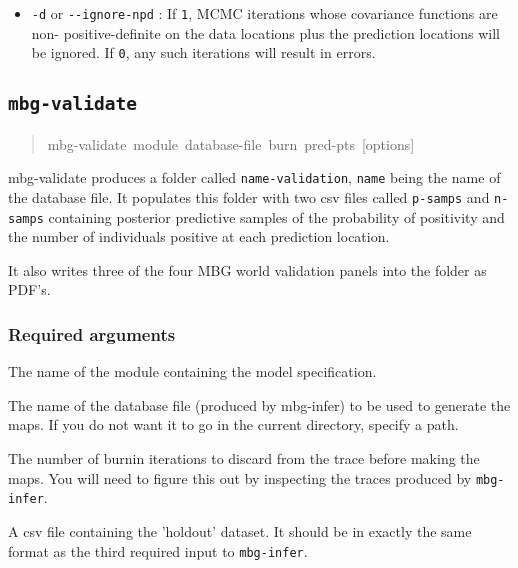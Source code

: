 
%
\begin{itemize}

\item \texttt{-d} or \texttt{-{}-ignore-npd} : If \texttt{1}, MCMC iterations whose covariance functions are non-
positive-definite on the data locations plus the prediction locations will be ignored. If
\texttt{0}, any such iterations will result in errors.

\end{itemize}




\subsection{\texttt{mbg-validate}%
}
%
\begin{quote}{\ttfamily \raggedright \noindent
mbg-validate~module~database-file~burn~pred-pts~{[}options{]}
}
\end{quote}

mbg-validate produces a folder called \texttt{name-validation}, \texttt{name} being the name of the database file.
It populates this folder with two csv files called \texttt{p-samps} and \texttt{n-samps} containing posterior
predictive samples of the probability of positivity and the number of individuals positive at each
prediction location.

It also writes three of the four MBG world validation panels into the folder as PDF's.




\subsubsection{Required arguments%
}
\setcounter{listcnt0}{0}
\begin{list}{.}
{
\setlength{\rightmargin}{\leftmargin}
}

\item The name of the module containing the model specification.

\item The name of the database file (produced by mbg-infer) to be used to generate the
maps. If you do not want it to go in the current directory, specify a path.

\item The number of burnin iterations to discard from the trace before making the maps.
You will need to figure this out by inspecting the traces produced by \texttt{mbg-infer}.

\item A csv file containing the 'holdout' dataset. It should be in exactly the same format
as the third required input to \texttt{mbg-infer}.
\end{list}




